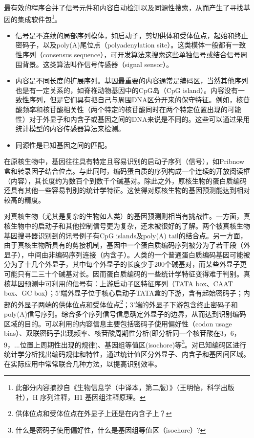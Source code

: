 \documentclass[11pt,a4paper,twoside]{book}
\begin{document}
最有效的程序合并了信号元件和内容自动检测以及同源性搜索，从而产生了寻找基因的集成软件包\footnote{此部分内容摘抄自《生物信息学（中译本，第二版）》（王明怡，科学出版社），H 序列注释，H1 基因组注释原理。}。
\begin{itemize}
  \item 信号是不连续的局部序列模体，如启动子，剪切供体和受体位点，起始和终止密码子，以及poly(A)尾位点（polyadenylation site）。这类模体一般都有一致性序列（consensus sequence），可开发算法来搜索这些单独信号或结合信号周围背景。这类算法叫作信号传感器（signal sensor）。
  \item 内容是不同长度的扩展序列。基因最重要的内容通常是编码区，当然其他序列也是有一定关系的，如脊椎动物基因中的CpG岛（CpG island）。内容没有一致性序列，但是它们具有把自己与周围DNA区分开来的保守特征。例如，核苷酸频率和核苷酸相关性（两个特定的核苷酸同时在两个特定位置出现的可能性）对于外显子和内含子或基因之间的DNA来说是不同的。这些可以通过采用统计模型的内容传感器算法来检测。
  \item 同源性是已知基因之间的匹配。
\end{itemize}

在原核生物中，基因往往具有特定且容易识别的启动子序列（信号），如Pribnow盒和转录因子结合位点。与此同时，编码蛋白质的序列构成一个连续的开放阅读框（内容），其长度约为数百个到数千个碱基对。除此之外，原核生物的蛋白质编码还具有其他一些容易判别的统计学特征。这使得对原核生物的基因预测能达到相对较高的精度。

对真核生物（尤其是复杂的生物如人类）的基因预测则相当有挑战性。一方面，真核生物中的启动子和其他控制信号更为复杂，还未被很好的了解。两个被真核生物基因搜寻器识别到的讯号例子有CpG islands及poly(A) tail的结合点。另一方面，由于真核生物所具有的剪接机制，基因中一个蛋白质编码序列被分为了若干段（外显子），中间由非编码序列连接（内含子）。人类的一个普通蛋白质编码基因可能被分为了十几个外显子，其中每个外显子的长度少于200个碱基对，而某些外显子更可能只有二三十个碱基对长。因而蛋白质编码的一些统计学特征变得难于判别。真核基因预测中可利用的信号有：上游启动子区特征序列（TATA box、CAAT box、GC box）；5'端外显子位于核心启动子TATA盒的下游，含有起始密码子；内部的外显子两端的供体位点和受体位点\footnote{供体位点和受体位点在外显子上还是在内含子上？}；3'端的外显子下游包含终止密码子和poly(A)信号序列。综合多个序列信号信息确定外显子的边界，从而达到识别编码区域的目的。可以利用的内容信息主要包括密码子使用偏好性（codon usage bias）、双联密码子出现频率、核苷酸周期性分析(即分析同一个核苷酸在3，6，9，...位置上周期性出现的规律)、基因组等值区(isochore)等\footnote{什么是密码子使用偏好性，什么是基因组等值区（isochore）?}。对已知编码区进行统计学分析找出编码规律和特性，通过统计值区分外显子、内含子和基因间区域。在实际应用中常常联合几种方法，以提高识别效率。
\end{document}
